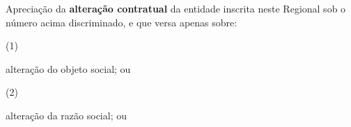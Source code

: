 \documentclass[openright, oneside, a4paper, article, brazil]{abntex2}
\begin{document}
\begin{framed}\small\raggedright
    \begin{minipage}[t]{\boxlarg}
        \raisebox{-2.2pt}{\fbox{\CheckBox[name=alteracao,bordercolor=black]{\null}}}
    \end{minipage}%
    \begin{minipage}[t]{\linewidth-\boxlarg}
        Apreciação da \textbf{alteração contratual} da entidade inscrita neste Regional sob o número acima discriminado, e que versa apenas sobre:
        \vspace{\baselineskip}

        \begin{minipage}[t]{\boxlarg}
            \hfill{\null}
        \end{minipage}%
        \begin{minipage}[t]{\linewidth-\boxlarg}
            \begin{minipage}[t]{\boxlarg}
                \raisebox{-2.2pt}{\fbox{\CheckBox[name=alteracao_objetivo,bordercolor=black]{\null}}}
            \end{minipage}%
            \begin{minipage}[t]{0.8\boxlarg}
                (1)
            \end{minipage}%
            \begin{minipage}[t]{\linewidth-2\boxlarg}
                alteração do objeto social; ou
            \end{minipage}\vspace{0.5ex}
            \begin{minipage}[t]{\boxlarg}
                \raisebox{-2.2pt}{\fbox{\CheckBox[name=alteracao_razao,bordercolor=black]{\null}}}
            \end{minipage}%
            \begin{minipage}[t]{0.8\boxlarg}
                (2)
            \end{minipage}%
            \begin{minipage}[t]{\linewidth-2\boxlarg}
                alteração da razão social; ou
            \end{minipage}\vspace{0.5ex}
            \begin{minipage}[t]{\boxlarg}
                \raisebox{-2.4pt}{\fbox{\CheckBox[name=alteracao_capital_social,bordercolor=black]{\null}}}
            \end{minipage}%
            \begin{minipage}[t]{0.8\boxlarg}

\end{minipage}
\end{minipage}
\end{minipage}
\end{framed}
\end{document}
